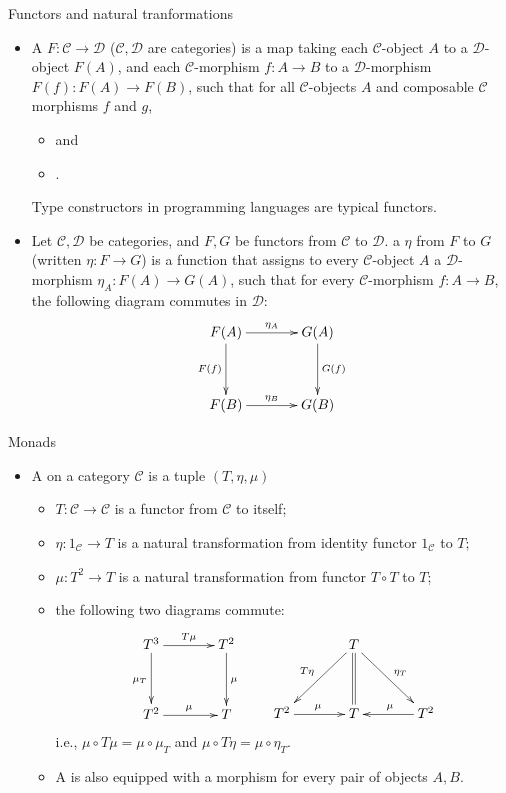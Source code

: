 \documentclass[paper=screen,mode=present,style=zysimple]{powerdot}
\begin{document}
\begin{slide}{Functors and natural tranformations}
\begin{itemize}\small
\item A  $F : \mathcal C \to \mathcal D$ ($\mathcal C, \mathcal D$ are categories) is a map 
taking each $\mathcal C$-object $A$ to a $\mathcal D$-object $F(A)$, and each $\mathcal C$-morphism $f: A \to B$ 
to a $\mathcal D$-morphism $F(f) : F(A) \to F(B)$, such that for all $\mathcal C$-objects $A$ and composable 
$\mathcal C$ morphisms $f$ and $g$, \vspace*{-0.6em}
\begin{itemize}
\item {} and 
\item {}. 
\vspace*{-0.6em}
\end{itemize}
Type constructors in programming languages are typical functors. 
\item Let $\mathcal C, \mathcal D$ be categories, and $F, G$ be functors from $\mathcal C$ to $\mathcal D$. 
a  $\eta$ from $F$ to $G$ (written $\eta: F \to G$) is a function that assigns 
to every $\mathcal C$-object $A$ a $\mathcal D$-morphism $\eta_A: F(A) \to G(A)$, 
such that for every $\mathcal C$-morphism $f: A \to B$, the following diagram commutes in $\mathcal D$:
$$
\xymatrix@+=3pc{
  F(A) \ar[r]^{\eta_A} \ar[d]_{F(f)} &  G(A) \ar[d]^{G(f)} \\
  F(B) \ar[r]^{\eta_B} & G(B)
}
$$
\end{itemize}
\end{slide}

\begin{slide}{Monads}
\begin{itemize}
\item A  on a category $\mathcal C$ is a tuple $(T, \eta, \mu)$
\begin{itemize}
\item $T: \mathcal C \to \mathcal C$ is a functor from $\mathcal C$ to itself;
\item $\eta: 1_{\mathcal C} \to T$ is a natural transformation from identity functor $1_{\mathcal C}$ to $T$;
\item $\mu: T^2 \to T$ is a natural transformation from functor $T \circ T$ to $T$;
\item the following two diagrams commute:
$$
\xymatrix@+=3pc{
  T^3 \ar[r]^{T \mu} \ar[d]_{\mu_T} &  T^2 \ar[d]^{\mu} \\
  T^2 \ar[r]^{\mu} & T
}
\qquad 
\xymatrix@+=3pc{
  &  T \ar[dl]_{T \eta} \ar@{=}[d] \ar[dr]^{\eta_T} & \\
  T^2 \ar[r]^{\mu} & T & T^2 \ar[l]_{\mu}
}
$$
i.e., $\mu \circ T \mu = \mu \circ \mu_T$ and $\mu \circ T \eta = \mu \circ \eta_T$.
\item A  is also equipped with a morphism 
   for every pair of objects $A, B$.
\end{itemize}
\end{itemize}
\end{slide}
\end{document}
